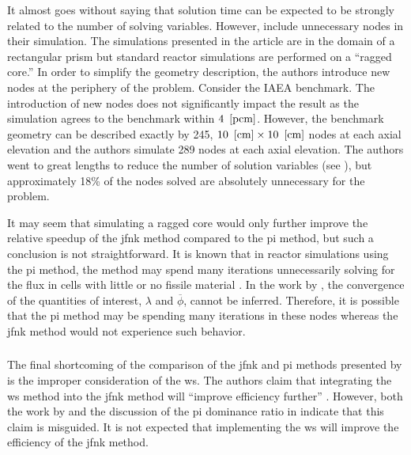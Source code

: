       It almost goes without saying that solution time can be expected to be
      strongly related to the number of solving variables. However,
      \citeauthor{qe2paper} include unnecessary nodes in their simulation. The
      simulations presented in the article are in the domain of a rectangular
      prism but standard reactor simulations are performed on a ``ragged core.''
      In order to simplify the geometry description, the authors introduce new
      nodes at the periphery of the problem. Consider the IAEA benchmark. The
      introduction of new nodes does not significantly impact the result as the
      simulation agrees to the benchmark within $4~\left[\text{{pcm}}\right]$. However, the
      benchmark geometry can be described exactly by 245, $10~\left[\text{{cm}}\right] \times
      10~\left[\text{{cm}}\right]$ nodes at each axial elevation and the authors simulate 289
      nodes at each axial elevation. The authors went to great lengths to reduce
      the number of solution variables (see ), but
      approximately 18\% of the nodes solved are absolutely unnecessary for the
      problem.

      It may seem that simulating a ragged core would only further improve the
      relative speedup of the \gls{jfnk} method compared to the \gls{pi} method,
      but such a conclusion is not straightforward. It is known that in reactor
      simulations using the \gls{pi} method, the method may spend many
      iterations unnecessarily solving for the flux in cells with little or no
      fissile material \cite{gehinThesis}. In the work by \citeauthor{qe2paper},
      the convergence of the quantities of interest, $\lambda$ and
      $\overline{\phi}$, cannot be inferred. Therefore, it is possible that the
      \gls{pi} method may be spending many iterations in these nodes whereas the
      \gls{jfnk} method would not experience such behavior.

    \subsubsection{\texorpdfstring{}{Wielandt Shift}}
    \label{sec:wielandt_shift}

      The final shortcoming of the comparison of the \gls{jfnk} and \gls{pi}
      methods presented by \citeauthor{qe2paper} is the improper consideration
      of the \gls{ws}. The authors claim that integrating the \gls{ws} method
      into the \gls{jfnk} method will ``improve efficiency further''
      \cite{qe2paper}. However, both the work by \citeauthor{gill_azmy} and the
      discussion of the \gls{pi} dominance ratio in 
      indicate that this claim is misguided. It is not expected that
      implementing the \gls{ws} will improve the efficiency of the \gls{jfnk}
      method.

